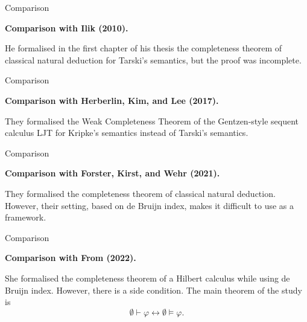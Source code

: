 \documentclass[serif,table,10pt]{beamer}
\newcommand{\0}{\texttt{0}}
\newcommand{\1}{\texttt{1}}
\begin{document}
\begin{frame}{Comparison}

    \textbf{Comparison with Ilik (2010).}

    He formalised in the first chapter of his thesis the completeness theorem of classical natural deduction for Tarski's semantics, but the proof was incomplete.

\end{frame}

\begin{frame}{Comparison}

   \textbf{Comparison with Herberlin, Kim, and Lee (2017).}

   They formalised the Weak Completeness Theorem of the Gentzen-style sequent calculus LJT for Kripke's semantics instead of Tarski's semantics.


\end{frame}

\begin{frame}{Comparison}

    \textbf{Comparison with Forster, Kirst, and Wehr (2021).}

    They formalised the completeness theorem of classical natural deduction. However, their setting, based on de Bruijn index, makes it difficult to use as a framework.

\end{frame}

\begin{frame}{Comparison}

    \textbf{Comparison with From (2022).}

    She formalised the completeness theorem of a Hilbert calculus while using de Bruijn index. However, there is a side condition.
    The main theorem of the study is \[ \emptyset \vdash \varphi \leftrightarrow \emptyset \vDash \varphi . \]

\end{frame}
\end{document}
